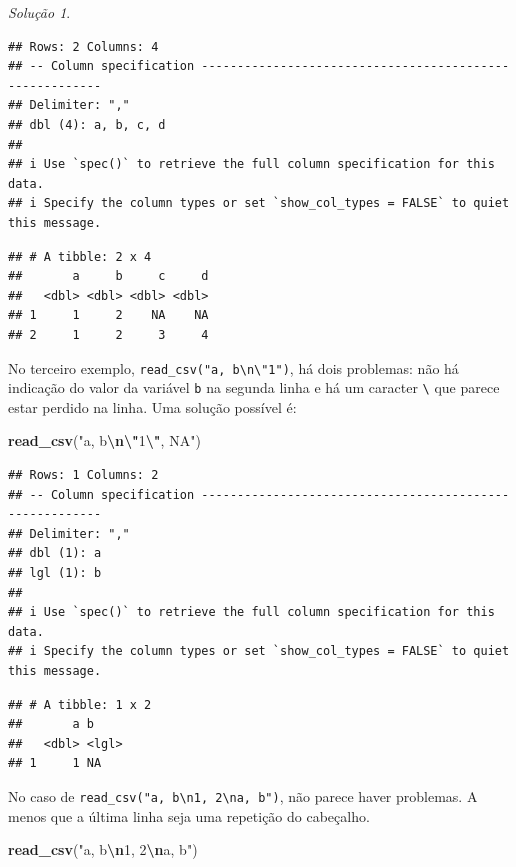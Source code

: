 \documentclass[
]{latex/krantz}
\newenvironment{Shaded}{\begin{snugshade}}{\end{snugshade}}
\newcommand{\FunctionTok}[1]{\textcolor[rgb]{0.13,0.29,0.53}{\textbf{#1}}}
\newcommand{\NormalTok}[1]{#1}
\newcommand{\SpecialCharTok}[1]{\textcolor[rgb]{0.81,0.36,0.00}{\textbf{#1}}}
\newcommand{\StringTok}[1]{\textcolor[rgb]{0.31,0.60,0.02}{#1}}
\theoremstyle{definition}
\theoremstyle{definition}
\theoremstyle{definition}
\theoremstyle{definition}
\theoremstyle{remark}
\newtheorem*{solution}{Solução}
\begin{document}
\begin{solution}
\begin{verbatim}
## Rows: 2 Columns: 4
## -- Column specification --------------------------------------------------------
## Delimiter: ","
## dbl (4): a, b, c, d
## 
## i Use `spec()` to retrieve the full column specification for this data.
## i Specify the column types or set `show_col_types = FALSE` to quiet this message.
\end{verbatim}

\begin{verbatim}
## # A tibble: 2 x 4
##       a     b     c     d
##   <dbl> <dbl> <dbl> <dbl>
## 1     1     2    NA    NA
## 2     1     2     3     4
\end{verbatim}

No terceiro exemplo, \texttt{read\_csv("a,\ b\textbackslash{}n\textbackslash{}"1")}, há dois problemas: não há indicação do valor da variável \texttt{b} na segunda linha e há um caracter \texttt{\textbackslash{}} que parece estar perdido na linha. Uma solução possível é:

\begin{Shaded}
\begin{Highlighting}[]
\FunctionTok{read\_csv}\NormalTok{(}\StringTok{"a, b}\SpecialCharTok{\textbackslash{}n\textbackslash{}"}\StringTok{1}\SpecialCharTok{\textbackslash{}"}\StringTok{, NA"}\NormalTok{)}
\end{Highlighting}
\end{Shaded}

\begin{verbatim}
## Rows: 1 Columns: 2
## -- Column specification --------------------------------------------------------
## Delimiter: ","
## dbl (1): a
## lgl (1): b
## 
## i Use `spec()` to retrieve the full column specification for this data.
## i Specify the column types or set `show_col_types = FALSE` to quiet this message.
\end{verbatim}

\begin{verbatim}
## # A tibble: 1 x 2
##       a b    
##   <dbl> <lgl>
## 1     1 NA
\end{verbatim}

No caso de \texttt{read\_csv("a,\ b\textbackslash{}n1,\ 2\textbackslash{}na,\ b")}, não parece haver problemas. A menos que a última linha seja uma repetição do cabeçalho.

\begin{Shaded}
\begin{Highlighting}[]
\FunctionTok{read\_csv}\NormalTok{(}\StringTok{"a, b}\SpecialCharTok{\textbackslash{}n}\StringTok{1, 2}\SpecialCharTok{\textbackslash{}n}\StringTok{a, b"}\NormalTok{)}
\end{Highlighting}
\end{Shaded}


\end{solution}
\end{document}
